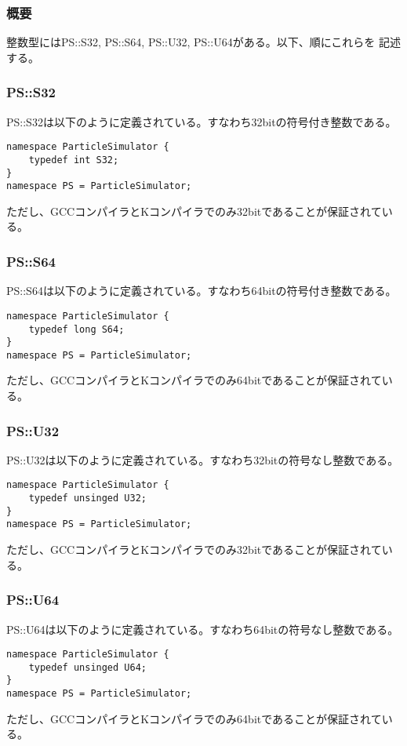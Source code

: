 \subsubsection{概要}

整数型にはPS::S32, PS::S64, PS::U32, PS::U64がある。以下、順にこれらを
記述する。

\subsubsection{PS::S32}

PS::S32は以下のように定義されている。すなわち32bitの符号付き整数である。
\begin{lstlisting}[caption=S32]
namespace ParticleSimulator {
    typedef int S32;
}
namespace PS = ParticleSimulator;
\end{lstlisting}

ただし、GCCコンパイラとKコンパイラでのみ32bitであることが保証されている。

\subsubsection{PS::S64}

PS::S64は以下のように定義されている。すなわち64bitの符号付き整数である。
\begin{lstlisting}[caption=S64]
namespace ParticleSimulator {
    typedef long S64;
}
namespace PS = ParticleSimulator;
\end{lstlisting}

ただし、GCCコンパイラとKコンパイラでのみ64bitであることが保証されている。

\subsubsection{PS::U32}

PS::U32は以下のように定義されている。すなわち32bitの符号なし整数である。
\begin{lstlisting}[caption=U32]
namespace ParticleSimulator {
    typedef unsinged U32;
}
namespace PS = ParticleSimulator;
\end{lstlisting}

ただし、GCCコンパイラとKコンパイラでのみ32bitであることが保証されている。

\subsubsection{PS::U64}

PS::U64は以下のように定義されている。すなわち64bitの符号なし整数である。
\begin{lstlisting}[caption=U64]
namespace ParticleSimulator {
    typedef unsinged U64;
}
namespace PS = ParticleSimulator;
\end{lstlisting}

ただし、GCCコンパイラとKコンパイラでのみ64bitであることが保証されている。

